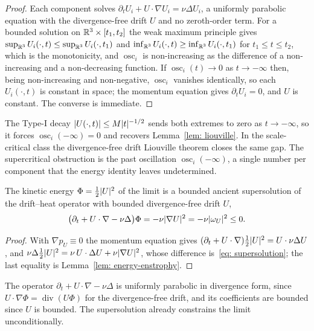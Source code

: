 \begin{proof}
Each component solves $\partial_t U_i + U\cdot\nabla U_i = \nu\Delta U_i$, a
uniformly parabolic equation with the divergence-free drift $U$ and no zeroth-order
term. For a bounded solution on $\mathbb{R}^3\times[t_1,t_2]$ the weak maximum principle
gives $\sup_{\mathbb{R}^3}U_i(\cdot,t)\le\sup_{\mathbb{R}^3}U_i(\cdot,t_1)$ and
$\inf_{\mathbb{R}^3}U_i(\cdot,t)\ge\inf_{\mathbb{R}^3}U_i(\cdot,t_1)$ for $t_1\le t\le t_2$, which is
the monotonicity, and $\operatorname{osc}_i$ is non-increasing as the difference of a
non-increasing and a non-decreasing function. If $\operatorname{osc}_i(t)\to0$ as
$t\to-\infty$ then, being non-increasing and non-negative, $\operatorname{osc}_i$
vanishes identically, so each $U_i(\cdot,t)$ is constant in space; the momentum
equation gives $\partial_t U_i = 0$, and $U$ is constant. The converse is immediate.
\end{proof}

The Type-I decay $\lvert U(\cdot,t) \rvert\le M\lvert t \rvert^{-1/2}$ sends both extremes to zero
as $t\to-\infty$, so it forces $\operatorname{osc}_i(-\infty)=0$ and recovers
Lemma~\ref{lem: liouville}. In the scale-critical class the divergence-free drift
Liouville theorem closes the same gap. The supercritical obstruction is the
past oscillation $\operatorname{osc}_i(-\infty)$, a single number per component that
the energy identity leaves undetermined.

\begin{lemma}\label{lem: supersolution}
The kinetic energy
$\Phi = \tfrac12\lvert U \rvert^2$ of the limit is a bounded ancient supersolution of the
drift--heat operator with bounded divergence-free drift $U$,
\begin{equation}\label{eq: supersolution}
  \bigl(\partial_t + U\cdot\nabla - \nu\Delta\bigr)\Phi
  = -\nu\lvert \nabla U \rvert^2 = -\nu\lvert \omega_U \rvert^2 \le 0 .
\end{equation}
\end{lemma}

\begin{proof}
With $\nabla p_U\equiv0$ the momentum equation gives
$(\partial_t + U\cdot\nabla)\tfrac12\lvert U \rvert^2 = U\cdot\nu\Delta U$, and
$\nu\Delta\tfrac12\lvert U \rvert^2 = \nu\,U\cdot\Delta U + \nu\lvert \nabla U \rvert^2$, whose
difference is~\eqref{eq: supersolution}; the last equality is
Lemma~\ref{lem: energy-enstrophy}.
\end{proof}

The operator $\partial_t + U\cdot\nabla - \nu\Delta$ is uniformly parabolic in
divergence form, since $U\cdot\nabla\Phi = \operatorname{div}(U\Phi)$ for the
divergence-free drift, and its coefficients are bounded since $U$ is bounded. The
supersolution already constrains the limit unconditionally.

